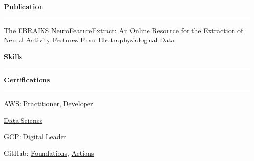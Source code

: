 \documentclass[11pt,letterpaper]{article}
\begin{document}
\begin{justify}
\begin{multicols}{2}
\begin{itemize}[label={}, itemsep=-5pt, leftmargin=0pt]
\begin{item}
                  \end{item}
            \end{itemize}
            \vspace*{\fill}
            \columnbreak
            \textbf{Publication}\strut
            \hrule
            \begin{itemize}[label={}, leftmargin=0pt, noitemsep]
                  \begin{item}
                        \href{https://www.frontiersin.org/articles/10.3389/fninf.2021.713899/full}{The EBRAINS NeuroFeatureExtract: An Online Resource for the Extraction of Neural Activity Features From Electrophysiological Data}
                  \end{item}
            \end{itemize}
            \vspace*{\fill}
      \end{multicols}
      \vspace{0.1cm}
      {\large \textbf{Skills}\strut}
      \hrule
      \begin{multicols}{3}
            \textbf{Certifications}\strut
            \hrule
            \begin{itemize}[label={}, itemsep=-5pt, leftmargin=0pt]
                  \begin{item}
                        AWS:
                        \href{https://www.credly.com/badges/33614ca6-2f0d-456b-87e9-bf8b8591cbf8/public_url}{Practitioner},
                        \href{https://www.credly.com/badges/e9b6c64c-2175-4345-950b-6331fd88af43/public_url}{Developer}
                  \end{item}
                  \begin{item}
                        \href{https://dariocurr.github.io/assets/doc/data_science.pdf}{Data Science}
                  \end{item}
                  \begin{item}
                        GCP:
                        \href{https://www.credential.net/1cd9c397-58b2-4d5d-9755-7277952de891}{Digital Leader}
                  \end{item}
                  \begin{item}
                        GitHub:
                        \href{https://www.credly.com/badges/0f59d53a-1ecb-4f6f-8a84-96fa3cb55965/public_url}{Foundations},
                        \href{https://www.credly.com/badges/6da40853-2bc6-4738-887e-8710a10e7a29/public_url}{Actions}
                  \end{item}

\end{itemize}
\end{multicols}
\end{justify}
\end{document}
